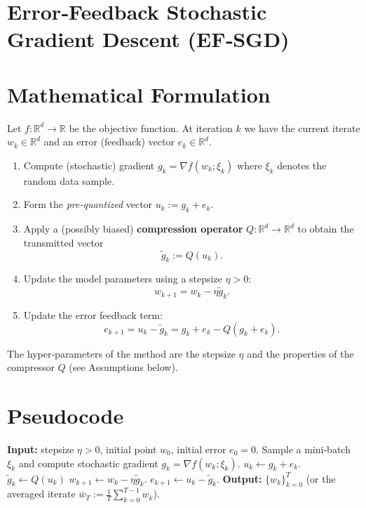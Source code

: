 \documentclass{article}
\begin{document}
\section*{Error‑Feedback Stochastic Gradient Descent (EF‑SGD)}

\section*{Mathematical Formulation}
Let $f:\mathbb{R}^d\rightarrow\mathbb{R}$ be the objective function.  
At iteration $k$ we have the current iterate $w_k\in\mathbb{R}^d$ and an error (feedback) vector $e_k\in\mathbb{R}^d$.

\begin{enumerate}[label=\arabic*.]
\item Compute (stochastic) gradient $g_k=\nabla f(w_k;\xi_k)$ where $\xi_k$ denotes the random data sample.
\item Form the \emph{pre‑quantized} vector $u_k:=g_k+e_k$.
\item Apply a (possibly biased) \textbf{compression operator} $Q:\mathbb{R}^d\rightarrow\mathbb{R}^d$ to obtain the transmitted vector
\[
\tilde g_k:=Q(u_k).
\]
\item Update the model parameters using a stepsize $\eta>0$:
\[
w_{k+1}=w_k-\eta \tilde g_k .
\]
\item Update the error feedback term:
\[
e_{k+1}=u_k-\tilde g_k = g_k+e_k-Q(g_k+e_k).
\]
\end{enumerate}

The hyper‑parameters of the method are the stepsize $\eta$ and the properties of the compressor $Q$ (see Assumptions below).

\section*{Pseudocode}
\begin{algorithm}[H]
\caption{EF‑SGD}
\begin{algorithmic}[1]
\STATE \textbf{Input:} stepsize $\eta>0$, initial point $w_0$, initial error $e_0=0$.
\STATE Sample a mini‑batch $\xi_k$ and compute stochastic gradient $g_k=\nabla f(w_k;\xi_k)$.
\STATE $u_k\gets g_k+e_k$.
\STATE $\tilde g_k\gets Q(u_k)$ \hfill{}
\STATE $w_{k+1}\gets w_k-\eta \tilde g_k$.
\STATE $e_{k+1}\gets u_k-\tilde g_k$.
\ENDFOR
\STATE \textbf{Output:} $\{w_k\}_{k=0}^T$ (or the averaged iterate $\bar w_T:=\frac1T\sum_{k=0}^{T-1}w_k$).
\end{algorithmic}
\end{algorithm}
\end{document}
